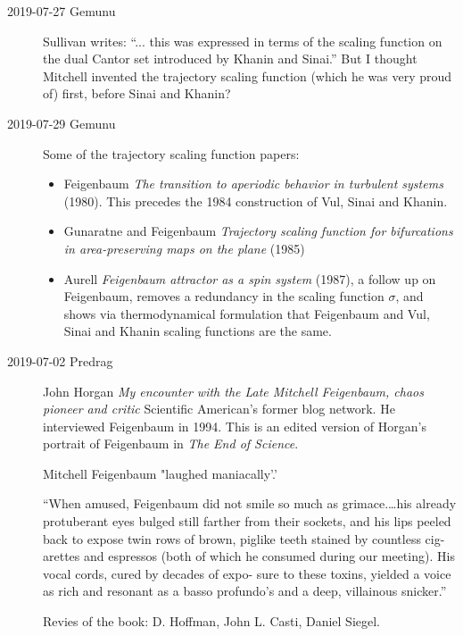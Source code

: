 \begin{description}
\item[2019-07-27 Gemunu]
Sullivan writes: ``... this was expressed in terms of the scaling
function on the dual Cantor set introduced by Khanin and Sinai.'' But I
thought Mitchell invented the trajectory scaling function (which he was
very proud of) first, before Sinai and Khanin?

\item[2019-07-29 Gemunu]
Some of the trajectory scaling function papers:
\begin{itemize}
  \item
Feigenbaum
{\em The transition to aperiodic behavior in turbulent systems} (1980).
This precedes the 1984 construction
of Vul, Sinai and Khanin.
  \item
Gunaratne and Feigenbaum {\em Trajectory scaling function
for bifurcations in area-preserving maps on the plane} (1985)
  \item
Aurell
{\em Feigenbaum attractor as a spin system} (1987),
a follow up on Feigenbaum, removes a redundancy in
the scaling function $\sigma$, and shows via thermodynamical formulation
that Feigenbaum and Vul, Sinai and Khanin
scaling functions are the same.
\end{itemize}

\item[2019-07-02 Predrag]
John Horgan
{\em My encounter with the Late {Mitchell Feigenbaum}, chaos pioneer and critic}
{Scientific American}'s former blog network.
He interviewed Feigenbaum in 1994.
This is an edited version of Horgan's portrait of Feigenbaum in 
{\em The End of Science}.

Mitchell Feigenbaum "laughed maniacally'.'

``When amused, Feigenbaum did not smile so much as grimace.…his already 
protuberant eyes bulged still farther from their sockets, and his lips 
peeled back to expose twin rows of brown, piglike teeth stained by 
countless cig- arettes and espressos (both of which he consumed during 
our meeting). His vocal cords, cured by decades of expo- sure to these 
toxins, yielded a voice as rich and resonant as a basso profundo’s and a 
deep, villainous snicker.'' 

Revies of the book:
{D. Hoffman},
 {John L. Casti},
 {Daniel Siegel}.


\end{description}
